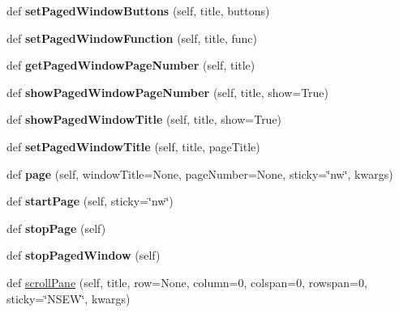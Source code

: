 \begin{DoxyCompactItemize}
def {\bfseries set\+Paged\+Window\+Buttons} (self, title, buttons)
\item 
\mbox{\label{classappjar_1_1gui_a3f66c5c7d5de781bb757aa8a8d34c803}} 
def {\bfseries set\+Paged\+Window\+Function} (self, title, func)
\item 
\mbox{\label{classappjar_1_1gui_a638c4efc6bdceefe1d371e78ea80e4fb}} 
def {\bfseries get\+Paged\+Window\+Page\+Number} (self, title)
\item 
\mbox{\label{classappjar_1_1gui_abd430e43e1d6589d9f49cee84624450a}} 
def {\bfseries show\+Paged\+Window\+Page\+Number} (self, title, show=True)
\item 
\mbox{\label{classappjar_1_1gui_a4392b03ca96956ca4d88c41da495c6d4}} 
def {\bfseries show\+Paged\+Window\+Title} (self, title, show=True)
\item 
\mbox{\label{classappjar_1_1gui_a1690c2b7475469d91bd0615617319007}} 
def {\bfseries set\+Paged\+Window\+Title} (self, title, page\+Title)
\item 
\mbox{\label{classappjar_1_1gui_a22eec22a86d9b3a5451d3b798ec0fd04}} 
def {\bfseries page} (self, window\+Title=None, page\+Number=None, sticky=\char`\"{}nw\char`\"{}, kwargs)
\item 
\mbox{\label{classappjar_1_1gui_a429537e072e07c29e834b8d6a71ba1b4}} 
def {\bfseries start\+Page} (self, sticky=\char`\"{}nw\char`\"{})
\item 
\mbox{\label{classappjar_1_1gui_ab718fa8d67caa20004eadc5a4b3b7b5f}} 
def {\bfseries stop\+Page} (self)
\item 
\mbox{\label{classappjar_1_1gui_af1d15c1877f8228910943628310fe5e8}} 
def {\bfseries stop\+Paged\+Window} (self)
\item 
\mbox{\label{classappjar_1_1gui_ae2843e1f8935a87446b510b9549cb8da}} 
def \hyperlink{classappjar_1_1gui_ae2843e1f8935a87446b510b9549cb8da}{scroll\+Pane} (self, title, row=None, column=0, colspan=0, rowspan=0, sticky=\char`\"{}N\+S\+EW\char`\"{}, kwargs)

\end{DoxyCompactItemize}
